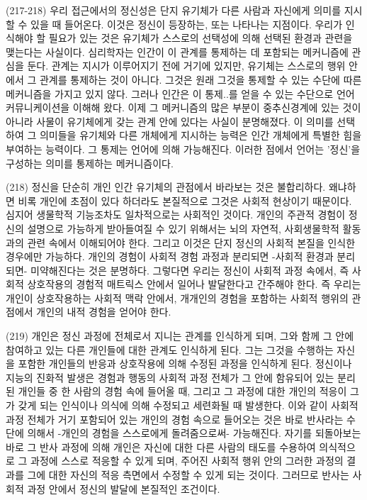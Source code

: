 \documentclass[11pt, a4paper]{article}
\begin{document}
(217-218) 우리 접근에서의 정신성은 단지 유기체가 다른 사람과 자신에게 의미를 지시할 수 있을 때 들어온다. 이것은 정신이 등장하는, 또는 나타나는 지점이다. 우리가 인식해야 할 필요가 있는 것은 유기체가 스스로의 선택성에 의해 선택된 환경과 관련을 맺는다는 사실이다. 심리학자는 인간이 이 관계를 통제하는 데 포함되는 메커니즘에 관심을 둔다. 관계는 지시가 이루어지기 전에 거기에 있지만, 유기체는 스스로의 행위 안에서 그 관계를 통제하는 것이 아니다. 그것은 원래 그것을 통제할 수 있는 수단에 따른 메커니즘을 가지고 있지 않다. 그러나 인간은 이 통제..를 얻을 수 있는 수단으로 언어 커뮤니케이션을 이해해 왔다. 이제 그 메커니즘의 많은 부분이 중추신경계에 있는 것이 아니라 사물이 유기체에게 갖는 관계 안에 있다는 사실이 분명해졌다. 이 의미를 선택하여 그 의미들을 유기체와 다른 개체에게 지시하는 능력은 인간 개체에게 특별한 힘을 부여하는 능력이다. 그 통제는 언어에 의해 가능해진다. 이러한 점에서 언어는 '정신'을 구성하는 의미를 통제하는 메커니즘이다.

(218) 정신을 단순히 개인 인간 유기체의 관점에서 바라보는 것은 불합리하다. 왜냐하면 비록 개인에 초점이 있다 하더라도 본질적으로 그것은 사회적 현상이기 때문이다. 심지어 생물학적 기능조차도 일차적으로는 사회적인 것이다. 개인의 주관적 경험이 정신의 설명으로 가능하게 받아들여질 수 있기 위해서는 뇌의 자연적, 사회생물학적 활동과의 관련 속에서 이해되어야 한다. 그리고 이것은 단지 정신의 사회적 본질을 인식한 경우에만 가능하다. 개인의 경험이 사회적 경험 과정과 분리되면 -사회적 환경과 분리되면- 미약해진다는 것은 분명하다. 그렇다면 우리는 정신이 사회적 과정 속에서, 즉 사회적 상호작용의 경험적 매트릭스 안에서 일어나 발달한다고 간주해야 한다. 즉 우리는 개인이 상호작용하는 사회적 맥락 안에서, 개개인의 경험을 포함하는 사회적 행위의 관점에서 개인의 내적 경험을 얻어야 한다. 

(219) 개인은 정신 과정에 전체로서 지니는 관계를 인식하게 되며, 그와 함께 그 안에 참여하고 있는 다른 개인들에 대한 관계도 인식하게 된다. 그는 그것을 수행하는 자신을 포함한 개인들의 반응과 상호작용에 의해 수정된 과정을 인식하게 된다. 정신이나 지능의 진화적 발생은 경험과 행동의 사회적 과정 전체가 그 안에 함유되어 있는 분리된 개인들 중 한 사람의 경험 속에 들어올 때, 그리고 그 과정에 대한 개인의 적응이 그가 갖게 되는 인식이나 의식에 의해 수정되고 세련화될 때 발생한다. 이와 같이 사회적 과정 전체가 거기 포함되어 있는 개인의 경험 속으로 들어오는 것은 바로 반사라는 수단에 의해서 -개인의 경험을 스스로에게 돌려줌으로써- 가능해진다. 자기를 되돌아보는 바로 그 반사 과정에 의해 개인은 자신에 대한 다른 사람의 태도를 수용하여 의식적으로 그 과정에 스스로 적응할 수 있게 되며, 주어진 사회적 행위 안의 그러한 과정의 결과를 그에 대한 자신의 적응 측면에서 수정할 수 있게 되는 것이다. 그러므로 반사는 사회적 과정 안에서 정신의 발달에 본질적인 조건이다.
\end{document}
